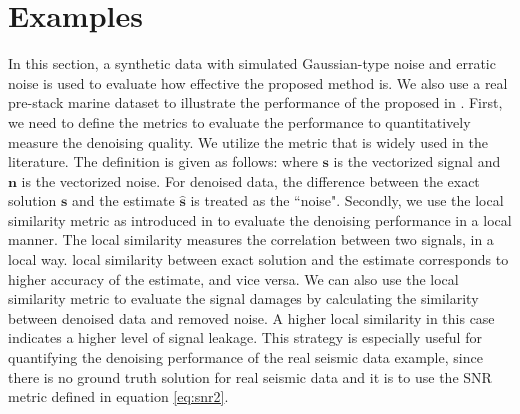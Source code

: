 \section{Examples}
In this section, a synthetic data with simulated Gaussian-type noise and erratic noise is used to evaluate how effective the proposed method is. We also use a real pre-stack marine dataset to illustrate the performance of the proposed  in . First, we need to define the metrics to evaluate the performance to quantitatively measure the denoising quality. We utilize the  metric that is widely used in the literature. The definition is given as follows:
where $\mathbf{s}$ is the vectorized signal and $\mathbf{n}$ is the vectorized noise. For denoised data, the difference between the exact solution $\mathbf{s}$ and the estimate $\hat{\mathbf{s}}$ is treated as the ``noise". Secondly, we use the local similarity metric as introduced in  to evaluate the denoising performance in a local manner. The local similarity measures the correlation between two signals, in a local way.  local similarity between  exact solution and the estimate corresponds to higher accuracy of the estimate, and vice versa.  We can also use the local similarity metric to evaluate the signal damages by calculating the similarity between denoised data and removed noise. A higher local similarity in this case indicates a higher level of signal leakage. This strategy is especially useful for quantifying the denoising performance of the real seismic data example, since there is no ground truth solution for real seismic data and it is  to use the SNR metric defined in equation \ref{eq:snr2}.  

